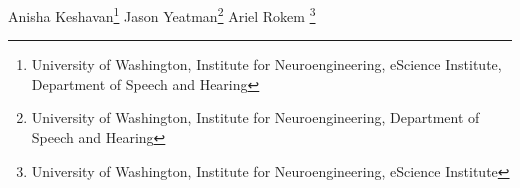 \iflatexml
Anisha Keshavan\footnote[1,2,3]{University of Washington, Institute for Neuroengineering, eScience Institute, Department of Speech and Hearing}
Jason Yeatman\footnote[1,3]{University of Washington, Institute for Neuroengineering, Department of Speech and Hearing}
Ariel Rokem \footnote[1,2] {University of Washington, Institute for Neuroengineering, eScience Institute}

\else %

\author[l1,l2,l3]{Anisha Keshavan}

\author[l1,l3]{Jason Yeatman}

\author[l1,l2]{Ariel Rokem}


\address[l1]{University of Washington, Institute for Neuroengineering}
\address[l2]{eScience Institute}
\address[l3]{Deparment of Speech and Hearing}

\fi